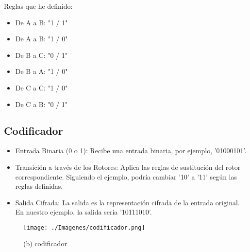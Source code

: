 \documentclass{article}
\begin{document}
    Reglas que he definido:
    \begin{itemize}
        \item De A a B: "1 / 1"
        \item De A a B: "1 / 0"
        \item De B a C: "0 / 1"
        \item De B a A: "1 / 0"
        \item De C a C: "1 / 0"
        \item De C a B: "0 / 1"
    \end{itemize}


    \newpage
    \subsection{Codificador}
    \begin{itemize}
        \item Entrada Binaria (0 o 1): Recibe una entrada binaria, por ejemplo, '01000101'.
        \item Transición a través de los Rotores: Aplica las reglas de sustitución del rotor correspondiente. Siguiendo el ejemplo, podría cambiar '10' a '11' según las reglas definidas.
        \item Salida Cifrada: La salida es la representación cifrada de la entrada original. En nuestro ejemplo, la salida sería '10111010'.
    \end{itemize}
    
    \vspace{\baselineskip} %
    \vspace{\baselineskip} %
    \vspace{\baselineskip} %

    \begin{figure}[!h]
        \centering
        \texttt{[image: ./Imagenes/codificador.png]}
        \caption*{(b) codificador}
    \end{figure}
\end{document}
